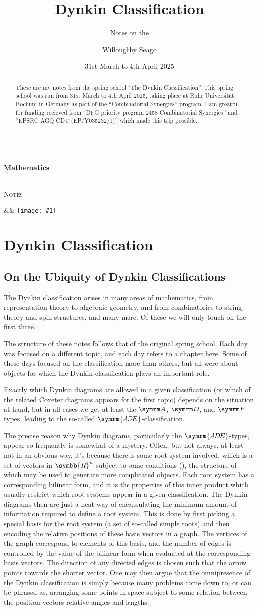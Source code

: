 \documentclass[fleqn, a4paper, openany]{memoir}
\title{Dynkin Classification}
\author{Willoughby Seago}
\date{31st March to 4th April 2025}
\subtitle{Notes on the}
\makeatletter
\newcommand{\@subtitle}{Mathematics}
\newcommand{\@subsubtitle}{Notes}
\newcommand{\titlepage}{%
    \begin{titlingpage}
        \begingroup%
        \raggedleft
        \vspace*{\baselineskip}
        {\LARGE \theauthor}\\[0.167\textheight]
        {\large\bfseries \@subtitle}\\[\baselineskip]
        {\HUGE\bfseries\textcolor{gray}{\thetitle}}\\[\baselineskip]
        {\large\thedate}\par
        \vspace*{2\baselineskip}
        \vfill
        {\LARGE\scshape \@subsubtitle}\par
        \vspace*{3\baselineskip}
        \endgroup
    \end{titlingpage}
}
\newcommand{\innertitlepage}[1]{%
    \maketitle  %
    \begin{abstract}  %
        \abstracttext
    \end{abstract}
    \begingroup\centering
    \vfill
    \ifx&#1&%
    \else
    \texttt{[image: \#1]}
    \fi
    \vfill
    \endgroup
}
\newcommand{\abstracttext}{These are my notes from the spring school \enquote{The Dynkin Classification}. This spring school was run from 31st March to 4th April 2025, taking place at Ruhr Universit\"at Bochum in Germany as part of the \enquote{Combinatorial Synergies} program. I am greatful for funding recieved from \enquote{DFG priority program 2458 Combinatorial Synergies} and \enquote{EPSRC AGQ CDT (EP/Y035232/1)} which made this trip possible.}
\newcommand{\ADE}{\ensuremath{\symrm{A\mkern-2muD\mkern-2muE}}}
\newcommand{\reals}{\symbb{R}}
\makeatother
\begin{document}
    \frontmatter
    \titlepage
    \innertitlepage{}
    \newpage
    \tableofcontents
    \mainmatter
    
    \addtocounter{chapter}{-1}
    \chapter{Dynkin Classification}
    \section{On the Ubiquity of Dynkin Classifications}
    The Dynkin classification arises in many areas of mathematics, from representation theory to algebraic geometry, and from combinatorics to string theory and spin structures, and many more.
    Of these we will only touch on the first three.
    
    The structure of these notes follows that of the original spring school.
    Each day was focused on a different topic, and each day refers to a chapter here.
    Some of these days focused on the classification more than others, but all were about objects for which the Dynkin classification plays an important role.
    
    Exactly which Dynkin diagrams are allowed in a given classification (or which of the related Coxeter diagrams appears for the first topic) depends on the situation at hand, but in all cases we get at least the \(\A\), \(\D\), and \(\E\) types, leading to the so-called \ADE-classification.
    
    The precise reason why Dynkin diagrams, particularly the \ADE-types, appear so frequently is somewhat of a mystery.
    Often, but not always, at least not in an obvious way, it's because there is some root system involved, which is a set of vectors in \(\reals^n\) subject to some conditions (), the structure of which may be used to generate more complicated objects.
    Each root system has a corresponding bilinear form, and it is the properties of this inner product which usually restrict which root systems appear in a given classification.
    The Dynkin diagrams then are just a neat way of encapsulating the minimum amount of information required to define a root system.
    This is done by first picking a special basis for the root system (a set of so-called simple roots) and then encoding the relative positions of these basis vectors in a graph.
    The vertices of the graph correspond to elements of this basis, and the number of edges is controlled by the value of the bilinear form when evaluated at the corresponding basis vectors.
    The direction of any directed edges is chosen such that the arrow points towards the shorter vector.
    One may then argue that the omnipresence of the Dynkin classification is simply because many problems come down to, or can be phrased as, arranging some points in space subject to some relation between the position vectors relative angles and lengths.
    
\end{document}

